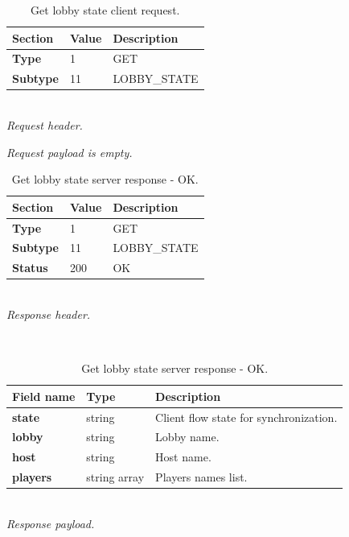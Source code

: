 \documentclass[english, sem, kiv, he, iso690alph, pdf, viewonly]{fasthesis}
\begin{document}
\begin{table}[h!]
	\centering
	\begin{minipage}[b]{0.45\textwidth}
		\centering
		\begin{tabular}{|l|l|l|}
			\hline
			\textbf{Section} & \textbf{Value} & \textbf{Description} \\ \hline
			\textbf{Type} & 1 & \footnotesize{GET} \\ \hline
			\textbf{Subtype} & 11 & \footnotesize{LOBBY\_STATE}  \\ \hline
		\end{tabular} \\
		\textit{Request header.}
	\end{minipage} 
	\hfill
	\begin{minipage}[b]{0.5\textwidth}
		\centering
		\textit{Request payload is empty.}
	\end{minipage}	
	\caption{Get lobby state client request.}
	\label{tab:get_lobby_state_request}
\end{table}

\begin{table}[h!]
	\centering
	\begin{minipage}[b]{1.0\textwidth}
		\centering
		\begin{tabular}{|l|l|l|}
			\hline
			\textbf{Section} & \textbf{Value} & \textbf{Description} \\ \hline
			\textbf{Type} & 1 & \footnotesize{GET} \\ \hline
			\textbf{Subtype} & 11 & \footnotesize{LOBBY\_STATE}  \\ \hline
			\textbf{Status} & 200 & \footnotesize{OK} \\ \hline
		\end{tabular} \\
		\textit{Response header.}
	\end{minipage} 
	\\
	\vspace{10pt}
	\begin{minipage}[b]{1.0\textwidth}
		\centering
		\begin{tabular}{|l|l|l|}
			\hline
			\textbf{Field name} & \textbf{Type} & \textbf{Description} \\ \hline
			\textbf{state} & string & Client flow state for synchronization. \\ \hline
			\textbf{lobby} & string & Lobby name. \\ \hline
			\textbf{host} & string & Host name. \\ \hline
			\textbf{players} & string array & Players names list. \\ \hline
		\end{tabular} \\
		\textit{Response payload.}
	\end{minipage}	
	\caption{Get lobby state server response - OK.}
	\label{tab:get_lobby_state_response_ok}
\end{table}
\end{document}
